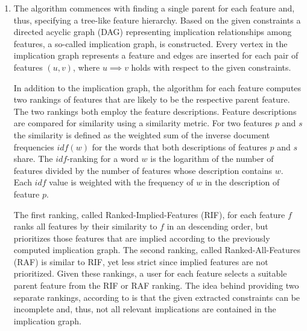 \begin{enumerate}
  \item The algorithm commences with finding a single parent for each
  feature and, thus, specifying a tree-like feature hierarchy. Based on the
  given constraints a directed acyclic graph (DAG) representing implication
  relationships among features, a so-called implication graph, is constructed.
  Every vertex in the implication graph represents a feature  and edges are
  inserted for each pair of features $(u, v)$, where  $u \implies v$ holds with respect to the given
  constraints.
   
  In addition to the implication graph, the algorithm for each feature computes
  two rankings of features that are likely to be the respective parent feature.
  The two rankings both employ the feature descriptions. Feature descriptions
  are compared for similarity using a similarity metric. For two features $p$
  and $s$ the similarity is defined as the weighted sum of the inverse document
  frequencies $idf(w)$ for the words that both descriptions of features $p$
  and $s$ share.
  The $idf$-ranking for a word $w$ is the logarithm of the number of features
  divided by the number of features whose description contains $w$. Each $idf$
  value is weighted with the frequency of $w$ in the description of
  feature $p$.
  
  The first ranking, called Ranked-Implied-Features (RIF), for each feature $f$
  ranks all features by their similarity to $f$ in an descending order, but
  prioritizes those features that are implied according to the previously
  computed implication graph. The second ranking, called Ranked-All-Features
  (RAF) is similar to RIF, yet less strict since implied features are not
  prioritized. Given these rankings, a user for each feature selects a suitable
  parent feature from the RIF or RAF ranking. The idea behind providing two
  separate rankings, according to \cite{she_reverse_2011} is that the given
  extracted constraints can be incomplete and, thus, not all relevant
  implications are contained in the implication graph.


\end{enumerate}
